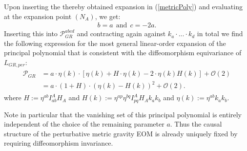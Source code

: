 Upon inserting the thereby obtained expansion in (\ref{metricPoly}) and evaluating at the expansion point $(N_A)$, we get:
\begin{align}
    b = a \ \ \text{and} \ \ c = -2a.
\end{align}
Inserting this into $\mathcal{P}_{GR}^{abcd}$ and contracting again against $k_a\cdot ...\cdot k_d$ in total we find the following expression for the most general linear-order expansion of the principal polynomial that is consistent with the diffeomorphism equivariance of $L_{GR,per}$:
\begin{align}
\begin{aligned}
    \mathcal{P}_{GR} &= a \cdot  \eta(k) \cdot \left [\eta(k) + H \cdot \eta(k)  -
    2 \cdot  \eta(k) H(k) \right ] + \mathcal{O}(2)\\
    &= a \cdot (1 + H) \cdot (\eta(k) - H(k))^2 + \mathcal{O}(2).
\end{aligned}
\end{align}
where  $H:=\eta^{ab} I^A_{ab} H_{A}$ and $H(k) := \eta^{ap} \eta^{bq} I_{pq}^A H_A k_a k_b$ and $\eta(k) := \eta^{ab}k_a k_b$. 
\begin{comment}
Taking a section $g \in \Gamma(F_{GR})$ and the corresponding inverse metric $g^{-1} \in \Gamma(F_{GR}^{\ast})$ with $(g^{-1})^{ab}=:g^{ab}$ and the usual relation $g^{ab}g_{bc}= \delta^a_c$ and evaluating the thus obtained most general expression for the principal polynomial we find
\begin{align}
    \mathcal{P}_{GR,per} (g_{ab}) = -a \cdot \mathrm{det}(g) g^{ab} g^{cd} k_ak_bk_ck_d + \mathcal{O}(2).
\end{align}
\end{comment}
Note in particular that the vanishing set of this principal polynomial is entirely independent of the choice of the remaining parameter $a$. Thus the causal structure of the perturbative metric gravity EOM is already uniquely fixed by requiring diffeomorphism invariance.

